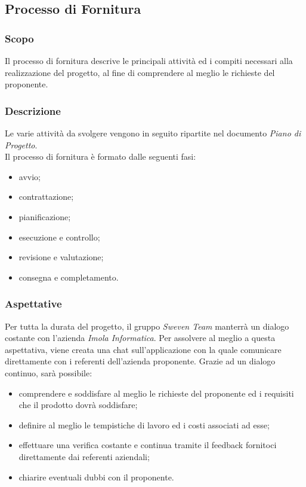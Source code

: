 \subsection{Processo di Fornitura}
\subsubsection{Scopo}
Il processo di fornitura descrive le principali attività ed i compiti necessari alla realizzazione del 
progetto, al fine di comprendere al meglio le richieste del proponente.

\subsubsection{Descrizione}
Le varie attività da svolgere vengono in seguito ripartite nel documento \textit{Piano di Progetto}. \\
Il processo di fornitura è formato dalle seguenti fasi: 
\begin{itemize}
    \item avvio;
    \item contrattazione;
    \item pianificazione;
    \item esecuzione e controllo;
    \item revisione e valutazione;
    \item consegna e completamento.
\end{itemize}

\subsubsection{Aspettative}
Per tutta la durata del progetto, il gruppo \textit{Sweven Team} manterrà un dialogo costante con l'azienda \textit{Imola Informatica}. 
Per assolvere al meglio a questa aspettativa, viene creata una chat sull'applicazione  con la quale comunicare direttamente con i referenti dell'azienda proponente. 
Grazie ad un dialogo continuo, sarà possibile:
\begin{itemize}
\item comprendere e soddisfare al meglio le richieste del proponente ed i requisiti che il prodotto dovrà soddisfare;
\item definire al meglio le tempistiche di lavoro ed i costi associati ad esse;
\item effettuare una verifica costante e continua tramite il feedback fornitoci direttamente dai referenti aziendali;
\item chiarire eventuali dubbi con il proponente.
\end{itemize}

